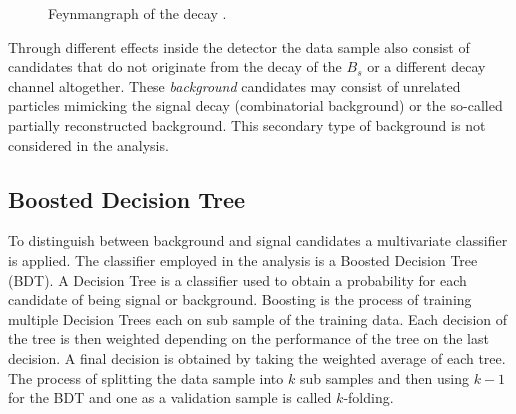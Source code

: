 \begin{figure}[htpb]
	\centering
	\def\widthscale {0.08\textwidth}
	\def\heightscale {0.04\textwidth}
	\usetikzlibrary{shapes.misc}
	\label{fig:feynman}
	\caption{Feynmangraph of the decay \signal.}
\end{figure}

Through different effects inside the detector the data sample also consist of candidates that do not originate from the decay of the $B_s$ or a different decay channel altogether. These \textit{background} candidates may consist of unrelated particles mimicking the signal decay (combinatorial background) or the so-called partially reconstructed background. This secondary type of background is not considered in the analysis. \\
\subsection{Boosted Decision Tree}
To distinguish between background and signal candidates a multivariate classifier is applied. The classifier employed in the analysis is a Boosted Decision Tree (BDT). A Decision Tree is a classifier used to obtain a probability for each candidate of being signal or background. Boosting is the process of training multiple Decision Trees each on sub sample of the training data. Each decision of the tree is then weighted depending on the performance of the tree on the last decision. A final decision is obtained by taking the weighted average of each tree. The process of splitting the data sample into $k$ sub samples and then using $k-1$ for the BDT and one as a validation sample is called $k$-folding.\\

